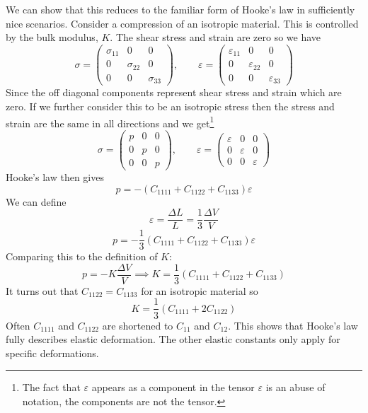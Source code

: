     We can show that this reduces to the familiar form of Hooke's law in sufficiently nice scenarios.
    Consider a compression of an isotropic material.
    This is controlled by the bulk modulus, \(K\).
    The shear stress and strain are zero so we have
    \[
        \sigma = 
        \begin{pmatrix}
            \sigma_{11} & 0 & 0\\
            0 & \sigma_{22} & 0\\
            0 & 0 & \sigma_{33}
        \end{pmatrix}
        ,\qquad
        \varepsilon = 
        \begin{pmatrix}
            \varepsilon_{11} & 0 & 0\\
            0 & \varepsilon_{22} & 0\\
            0 & 0 & \varepsilon_{33}
        \end{pmatrix}
    \]
    Since the off diagonal components represent shear stress and strain which are zero.
    If we further consider this to be an isotropic stress then the stress and strain are the same in all directions and we get\footnote{The fact that \(\varepsilon\) appears as a component in the tensor \(\varepsilon\) is an abuse of notation, the components are not the tensor.}
    \[
    \sigma = 
    \begin{pmatrix}
    p & 0 & 0\\
    0 & p & 0\\
    0 & 0 & p
    \end{pmatrix}
    ,\qquad
    \varepsilon = 
    \begin{pmatrix}
    \varepsilon & 0 & 0\\
    0 & \varepsilon & 0\\
    0 & 0 & \varepsilon
    \end{pmatrix}
    \]
    Hooke's law then gives
    \[p = -(C_{1111} + C_{1122} + C_{1133})\varepsilon\]
    We can define
    \[\varepsilon = \frac{\Delta L}{L} = \frac{1}{3}\frac{\Delta V}{V}\]
    \[p = -\frac{1}{3}(C_{1111} + C_{1122} + C_{1133})\varepsilon\]
    Comparing this to the definition of \(K\):
    \[p = -K\frac{\Delta V}{V}\implies K = \frac{1}{3}(C_{1111} + C_{1122} + C_{1133})\]
    It turns out that \(C_{1122} = C_{1133}\) for an isotropic material so
    \[K = \frac{1}{3}(C_{1111} + 2C_{1122})\]
    Often \(C_{1111}\) and \(C_{1122}\) are shortened to \(C_{11}\) and \(C_{12}\).
    This shows that Hooke's law fully describes elastic deformation.
    The other elastic constants only apply for specific deformations.
    
